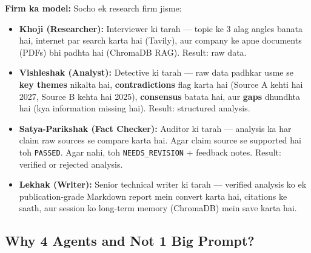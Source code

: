 \documentclass[11pt, a4paper]{article}
\begin{document}
\begin{storybox}
\textbf{Firm ka model:} Socho ek research firm jisme:

\begin{itemize}
\item \textbf{Khoji (Researcher):} Interviewer ki tarah --- topic ke 3 alag angles banata hai, internet par search karta hai (Tavily), aur company ke apne documents (PDFs) bhi padhta hai (ChromaDB RAG). Result: raw data.

\item \textbf{Vishleshak (Analyst):} Detective ki tarah --- raw data padhkar usme se \textbf{key themes} nikalta hai, \textbf{contradictions} flag karta hai (Source A kehti hai 2027, Source B kehta hai 2025), \textbf{consensus} batata hai, aur \textbf{gaps} dhundhta hai (kya information missing hai). Result: structured analysis.

\item \textbf{Satya-Parikshak (Fact Checker):} Auditor ki tarah --- analysis ka har claim raw sources se compare karta hai. Agar claim source se supported hai toh \texttt{PASSED}. Agar nahi, toh \texttt{NEEDS\_REVISION} + feedback notes. Result: verified or rejected analysis.

\item \textbf{Lekhak (Writer):} Senior technical writer ki tarah --- verified analysis ko ek publication-grade Markdown report mein convert karta hai, citations ke saath, aur session ko long-term memory (ChromaDB) mein save karta hai.
\end{itemize}
\end{storybox}

\subsection{Why 4 Agents and Not 1 Big Prompt?}
\end{document}
